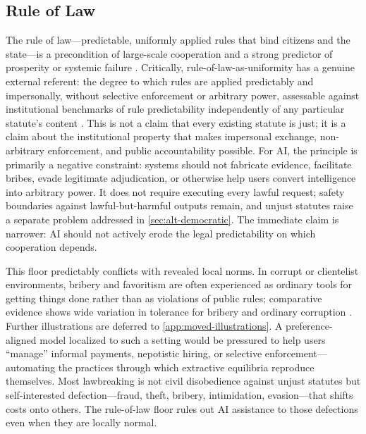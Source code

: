 \documentclass{article}
\theoremstyle{plain}
\theoremstyle{definition}
\theoremstyle{remark}
\begin{document}
\subsection{Rule of Law}
The rule of law---predictable, uniformly applied rules that bind citizens and the state---is a precondition of large-scale cooperation and a strong predictor of prosperity or systemic failure \citep{north1990institutions, acemoglu2012why}. Critically, rule-of-law-as-uniformity has a genuine external referent: the degree to which rules are applied predictably and impersonally, without selective enforcement or arbitrary power, assessable against institutional benchmarks of rule predictability independently of any particular statute's content \citep{north1990institutions}. This is not a claim that every existing statute is just; it is a claim about the institutional property that makes impersonal exchange, non-arbitrary enforcement, and public accountability possible. For AI, the principle is primarily a negative constraint: systems should not fabricate evidence, facilitate bribes, evade legitimate adjudication, or otherwise help users convert intelligence into arbitrary power. It does not require executing every lawful request; safety boundaries against lawful-but-harmful outputs remain, and unjust statutes raise a separate problem addressed in \cref{sec:alt-democratic}. The immediate claim is narrower: AI should not actively erode the legal predictability on which cooperation depends.

This floor predictably conflicts with revealed local norms. In corrupt or clientelist environments, bribery and favoritism are often experienced as ordinary tools for getting things done rather than as violations of public rules; comparative evidence shows wide variation in tolerance for bribery and ordinary corruption \citep{quah2011curbing, kravtsova2017values}. Further illustrations are deferred to \cref{app:moved-illustrations}. A preference-aligned model localized to such a setting would be pressured to help users ``manage'' informal payments, nepotistic hiring, or selective enforcement---automating the practices through which extractive equilibria reproduce themselves. Most lawbreaking is not civil disobedience against unjust statutes but self-interested defection---fraud, theft, bribery, intimidation, evasion---that shifts costs onto others. The rule-of-law floor rules out AI assistance to those defections even when they are locally normal.
\end{document}
